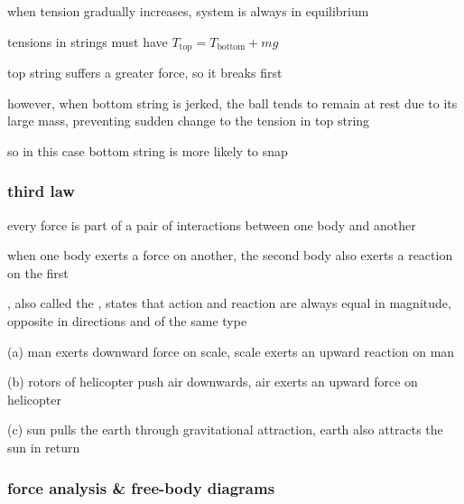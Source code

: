 \sol when tension gradually increases, system is always in equilibrium

tensions in strings must have $T_\text{top} = T_\text{bottom} + mg$

top string suffers a greater force, so it breaks first
	
however, when bottom string is jerked, the ball tends to remain at rest due to its large mass, preventing sudden change to the tension in top string

so in this case bottom string is more likely to snap \eoe





\subsubsection{third law}

every force is part of a pair of interactions between one body and another

when one body exerts a force on another, the second body also exerts a reaction on the first

\begin{ilight}
	, also called the , states that action and reaction are always equal in magnitude, opposite in directions and of the same type
\end{ilight}


\sol (a) man exerts downward force on scale, scale exerts an upward reaction on man

(b) rotors of helicopter push air downwards, air exerts an upward force on helicopter

(c) sun pulls the earth through gravitational attraction, earth also attracts the sun in return \eoe


\subsubsection{force analysis \& free-body diagrams}

